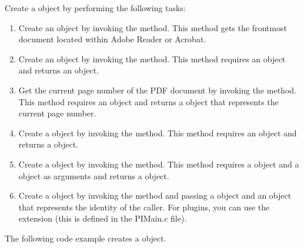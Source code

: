 \documentclass[letterpaper,12pt,english,openany,oneside]{sphinxmanual}
\begin{document}
Create a  object by performing the following tasks:
\begin{enumerate}
%
\item {} 
Create an  object by invoking the  method. This method gets the frontmost document located within Adobe Reader or Acrobat.

\item {} 
Create an  object by invoking the  method. This method requires an  object and returns an  object.

\item {} 
Get the current page number of the PDF document by invoking the  method. This method requires an  object and returns a  object that represents the current page number.

\item {} 
Create a  object by invoking the  method. This method requires an  object and returns a  object.

\item {} 
Create a  object by invoking the  method. This method requires a  object and a  object as arguments and returns a  object.

\item {} 
Create a  object by invoking the  method and passing a  object and an  object that represents the identity of the caller. For plugins, you can use the  extension (this is defined in the PIMain.c file).

\end{enumerate}

The following code example creates a  object.
\end{document}
